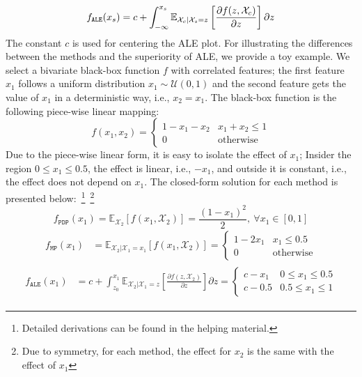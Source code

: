 \documentclass[wcp]{jmlr}
\newcommand{\E}{\mathbb{E}} \newcommand{\Jac}{\mathbf{J}}
\begin{document}
\begin{gather}
  \label{eq:ALE} f_{\mathtt{ALE}}(x_s) = c + \int_{-\infty}^{x_s} \mathbb{E}_{\mathcal{X}_c|\mathcal{X}_s=z}\left[\frac{\partial f(z, \mathcal{X}_c)}{\partial z}\right] \partial z
\end{gather}
%
The constant \(c\) is used for centering the ALE plot. For
illustrating the differences between the methods and the superiority
of ALE, we provide a toy example. We select a bivariate black-box
function \(f\) with correlated features; the first feature \( x_1 \)
follows a uniform distribution \( x_1 \sim \mathcal{U}(0,1)\) and the
second feature gets the value of \(x_1\) in a deterministic way, i.e.,
\( x_2 = x_1 \). The black-box function is the following piece-wise
linear mapping:
%
\begin{equation} \label{eq:example-1-mapping} f(x_1, x_2) =
  \begin{cases} 1 - x_1 - x_2 & x_1 + x_2 \leq 1 \\ 0 & \text{otherwise}
  \end{cases}
\end{equation}
\noindent
%
Due to the piece-wise linear form, it is easy to isolate the effect of
\(x_1\); Insider the region \(0 \leq x_1 \leq 0.5\), the effect is
linear, i.e., \(-x_1\), and outside it is constant, i.e., the effect
does not depend on \(x_1\). The closed-form solution for each method
is presented below:~\footnote{Detailed derivations can be found in the
  helping material.}~\footnote{ Due to symmetry, for each method, the
  effect for \(x_2\) is the same with the effect of \(x_1\)}
%
\begin{equation}\label{eq:example-1-pdp} f_{\mathtt{PDP}}(x_1) = \mathbb{\E}_{\mathcal{X}_2} \left [f(x_1,\mathcal{X}_2) \right] = \frac{{(1-x_1)}^2}{2}, \: \forall x_1 \in [0,1]
\end{equation}
%
\begin{equation} \label{eq:example-1-mplots}
  \begin{split} f_{\mathtt{MP}}(x_1) &= \E_{\mathcal{X}_2|\mathcal{X}_1 = x_1} \left [ f(x_1, \mathcal{X}_2) \right] = \begin{cases} 1 - 2x_1 & x_1 \leq 0.5 \\ 0 &\text{otherwise}
    \end{cases}
  \end{split}
\end{equation}
%
\begin{align}\label{eq:example-1-ale}
  \begin{split} f_{\mathtt{ALE}}(x_1) &= c + \int_{z_0}^{x_1} \E_{\mathcal{X}_2|\mathcal{X}_1=z} \left [ \frac{\partial f(z, \mathcal{X}_2)}{\partial z} \right] \partial z =
     \begin{cases} c - x_1 & 0 \leq x_1 \leq 0.5\\ c - 0.5 & 0.5 \leq x_1 \leq 1
    \end{cases}
  \end{split}
\end{align}
\end{document}
